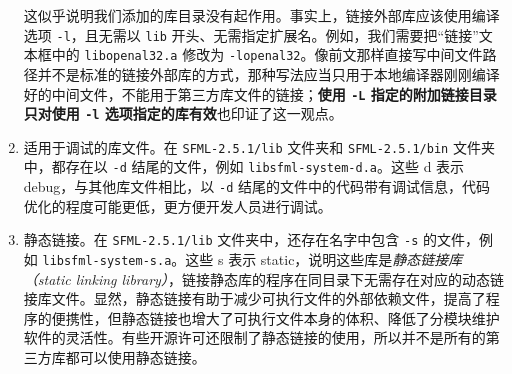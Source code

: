 \begin{enumerate}
	这似乎说明我们添加的库目录没有起作用。事实上，链接外部库应该使用编译选项 \lstinline[language={}]{-l}，且无需以 \lstinline[language={}]{lib} 开头、无需指定扩展名。例如，我们需要把“链接”文本框中的 \lstinline[language={}]{libopenal32.a} 修改为 \lstinline[language={}]{-lopenal32}。像前文那样直接写中间文件路径并不是标准的链接外部库的方式，那种写法应当只用于本地编译器刚刚编译好的中间文件，不能用于第三方库文件的链接；\textbf{使用 \lstinline[language={}]{-L} 指定的附加链接目录只对使用 \lstinline[language={}]{-l} 选项指定的库有效}也印证了这一观点。

	\item 适用于调试的库文件。在 \lstinline[language={}]{SFML-2.5.1/lib} 文件夹和 \lstinline[language={}]{SFML-2.5.1/bin} 文件夹中，都存在以 \lstinline[language={}]{-d} 结尾的文件，例如 \lstinline[language={}]{libsfml-system-d.a}。这些 d 表示 debug，与其他库文件相比，以 \lstinline[language={}]{-d} 结尾的文件中的代码带有调试信息，代码优化的程度可能更低，更方便开发人员进行调试。

	\item 静态链接。在 \lstinline[language={}]{SFML-2.5.1/lib} 文件夹中，还存在名字中包含 \lstinline[language={}]{-s} 的文件，例如 \lstinline[language={}]{libsfml-system-s.a}。这些 s 表示 static，说明这些库是\emph{静态链接库（static linking library）}，链接静态库的程序在同目录下无需存在对应的动态链接库文件。显然，静态链接有助于减少可执行文件的外部依赖文件，提高了程序的便携性，但静态链接也增大了可执行文件本身的体积、降低了分模块维护软件的灵活性。有些开源许可还限制了静态链接的使用，所以并不是所有的第三方库都可以使用静态链接。
\end{enumerate}
